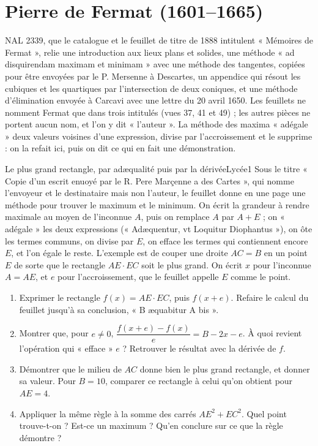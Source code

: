 \documentclass[11pt,a4paper]{article}
\begin{document}
\section*{Pierre de Fermat (1601--1665)}

NAL 2339, que le catalogue et le feuillet de titre de 1888 intitulent
« Mémoires de Fermat », relie une introduction aux lieux plans et solides, une
méthode « ad disquirendam maximam et minimam » avec une méthode des tangentes,
copiées pour être envoyées par le P. Mersenne à Descartes, un appendice qui
résout les cubiques et les quartiques par l'intersection de deux coniques, et
une méthode d'élimination envoyée à Carcavi avec une lettre du 20 avril 1650.
Les feuillets ne nomment Fermat que dans trois intitulés (vues 37, 41 et 49) ;
les autres pièces ne portent aucun nom, et l'on y dit « l'auteur ». La méthode
des maxima « adégale » deux valeurs voisines d'une expression, divise par
l'accroissement et le supprime : on la refait ici, puis on dit ce qui en fait
une démonstration.

\begin{exercice}{Le plus grand rectangle, par adæqualité puis par la dérivée}{Lycée}{1}
Sous le titre « Copie d'un escrit enuoyé par le R. Pere Marçenne a des Cartes »,
qui nomme l'envoyeur et le destinataire mais non l'auteur, le feuillet donne en
une page une méthode pour trouver le maximum et le minimum. On écrit la
grandeur à rendre maximale au moyen de l'inconnue $A$, puis on remplace $A$ par
$A + E$ ; on « adégale » les deux expressions (« Adæquentur, vt Loquitur
Diophantus »), on ôte les termes communs, on divise par $E$, on efface les
termes qui contiennent encore $E$, et l'on égale le reste. L'exemple est de
couper une droite $AC = B$ en un point $E$ de sorte que le rectangle
$AE \cdot EC$ soit le plus grand. On écrit $x$ pour l'inconnue $A = AE$, et $e$
pour l'accroissement, que le feuillet appelle $E$ comme le point.
\begin{enumerate}
\item Exprimer le rectangle $f(x) = AE \cdot EC$, puis $f(x + e)$. Refaire le
  calcul du feuillet jusqu'à sa conclusion, « B æquabitur A bis ».
\item Montrer que, pour $e \neq 0$, $\dfrac{f(x+e) - f(x)}{e} = B - 2x - e$. À
  quoi revient l'opération qui « efface » $e$ ? Retrouver le résultat avec la
  dérivée de $f$.
\item Démontrer que le milieu de $AC$ donne bien le plus grand rectangle, et
  donner sa valeur. Pour $B = 10$, comparer ce rectangle à celui qu'on obtient
  pour $AE = 4$.
\item Appliquer la même règle à la somme des carrés $AE^2 + EC^2$. Quel point
  trouve-t-on ? Est-ce un maximum ? Qu'en conclure sur ce que la règle
  démontre ?
\end{enumerate}
\end{exercice}
\end{document}
